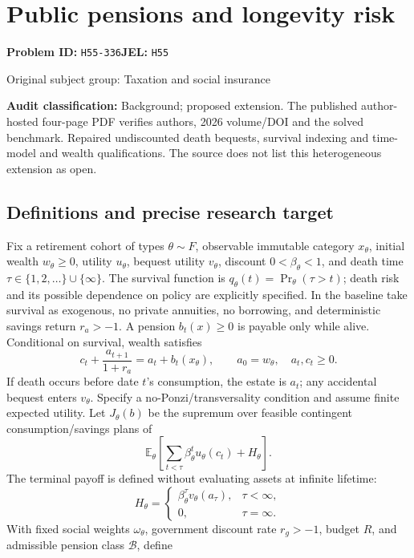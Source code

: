 \documentclass[11pt,a4paper]{article}
\begin{document}
\section*{Public pensions and longevity risk}
\textbf{Problem ID:} \texttt{H55-336}\quad \textbf{JEL:} \texttt{H55}\par
\label{problem:OP-0479}
{\sffamily\small\color{muted}Original subject group: Taxation and social insurance\par}
\label{definitions:problem:30007761}
\textbf{Audit classification:} Background; proposed extension. The published author-hosted four-page PDF verifies authors, 2026 volume/DOI and the solved benchmark. Repaired undiscounted death bequests, survival indexing and time-model and wealth qualifications. The source does not list this heterogeneous extension as open.
\subsection*{Definitions and precise research target}
Fix a retirement cohort of types \(\theta\sim F\), observable immutable category \(x_\theta\), initial wealth \(w_\theta\geq0\), utility \(u_\theta\), bequest utility \(v_\theta\), discount \(0<\beta_\theta<1\), and death time \(\tau\in\{1,2,\ldots\}\cup\{\infty\}\). The survival function is \(q_\theta(t)=\Pr_\theta(\tau>t)\); death risk and its possible dependence on policy are explicitly specified. In the baseline take survival as exogenous, no private annuities, no borrowing, and deterministic savings return \(r_a>-1\). A pension \(b_t(x)\geq0\) is payable only while alive. Conditional on survival, wealth satisfies
\[
 c_t+\frac{a_{t+1}}{1+r_a}=a_t+b_t(x_\theta),\qquad
 a_0=w_\theta,\quad a_t,c_t\geq0.
\]
If death occurs before date \(t\)'s consumption, the estate is \(a_t\); any accidental bequest enters \(v_\theta\). Specify a no-Ponzi/transversality condition and assume finite expected utility. Let \(J_\theta(b)\) be the supremum over feasible contingent consumption/savings plans of
\[
 \mathbb E_\theta\!\left[\sum_{t<\tau}\beta_\theta^tu_\theta(c_t)
 +H_\theta\right].
\]
The terminal payoff is defined without evaluating assets at infinite lifetime:
\[
 H_\theta=\begin{cases}
 \beta_\theta^\tau v_\theta(a_\tau),&\tau<\infty,\\
 0,&\tau=\infty.
 \end{cases}
\]
With fixed social weights \(\omega_\theta\), government discount rate \(r_g>-1\), budget \(R\), and admissible pension class \(\mathcal B\), define
\end{document}
